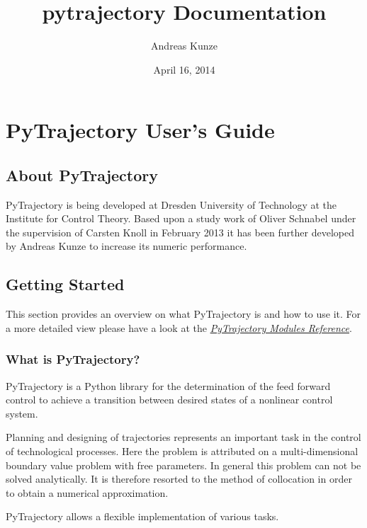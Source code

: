 \documentclass[letterpaper,10pt,english]{sphinxmanual}
\title{pytrajectory Documentation}
\date{April 16, 2014}
\author{Andreas Kunze}
\begin{document}
\maketitle
\tableofcontents
{}\label{index::doc}



\chapter{PyTrajectory User's Guide}
\label{guide/index:pytrajectory-user-s-guide}\label{guide/index:welcome-to-pytrajectory-s-documentation}\label{guide/index::doc}

\section{About PyTrajectory}
\label{guide/about:about-pytrajectory}\label{guide/about::doc}
PyTrajectory is being developed at Dresden University of Technology at the Institute for Control Theory.
Based upon a study work of Oliver Schnabel under the supervision of Carsten Knoll in February 2013
it has been further developed by Andreas Kunze to increase its numeric performance.


\section{Getting Started}
\label{guide/start:getting-started}\label{guide/start::doc}
This section provides an overview on what PyTrajectory is and how to use it.
For a more detailed view please have a look at the {\hyperref[pytrajectory:pytrajectory]{\emph{PyTrajectory Modules Reference}}}.


\subsection{What is PyTrajectory?}
\label{guide/start:what-is-pytrajectory}
PyTrajectory is a Python library for the determination of the feed forward control
to achieve a transition between desired states of a nonlinear control system.

Planning and designing of trajectories represents an important task in
the control of technological processes. Here the problem is attributed
on a multi-dimensional boundary value problem with free parameters.
In general this problem can not be solved analytically. It is therefore
resorted to the method of collocation in order to obtain a numerical
approximation.

PyTrajectory allows a flexible implementation of various tasks.
\end{document}
